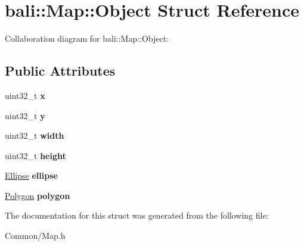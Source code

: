 \hypertarget{structbali_1_1_map_1_1_object}{\section{bali\-:\-:Map\-:\-:Object Struct Reference}
\label{structbali_1_1_map_1_1_object}
}


Collaboration diagram for bali\-:\-:Map\-:\-:Object\-:
\subsection*{Public Attributes}
\begin{DoxyCompactItemize}
\item 
\hypertarget{structbali_1_1_map_1_1_object_a48a676b160cba14e41cd5d424c300ed9}{uint32\-\_\-t {\bfseries x}}\label{structbali_1_1_map_1_1_object_a48a676b160cba14e41cd5d424c300ed9}

\item 
\hypertarget{structbali_1_1_map_1_1_object_a9799e10c9ddc1993c0f468b83ffc9092}{uint32\-\_\-t {\bfseries y}}\label{structbali_1_1_map_1_1_object_a9799e10c9ddc1993c0f468b83ffc9092}

\item 
\hypertarget{structbali_1_1_map_1_1_object_a9a1d1a6454c9e4ff726bd398fb3a0799}{uint32\-\_\-t {\bfseries width}}\label{structbali_1_1_map_1_1_object_a9a1d1a6454c9e4ff726bd398fb3a0799}

\item 
\hypertarget{structbali_1_1_map_1_1_object_a082189ce38ec29714a0b2bb5f135d6af}{uint32\-\_\-t {\bfseries height}}\label{structbali_1_1_map_1_1_object_a082189ce38ec29714a0b2bb5f135d6af}

\item 
\hypertarget{structbali_1_1_map_1_1_object_a517b2ac63039a2f255997d10d40907d4}{\hyperlink{structbali_1_1_map_1_1_ellipse}{Ellipse} {\bfseries ellipse}}\label{structbali_1_1_map_1_1_object_a517b2ac63039a2f255997d10d40907d4}

\item 
\hypertarget{structbali_1_1_map_1_1_object_af18f407bd4f478ed4b04b0770f9fcf7d}{\hyperlink{structbali_1_1_map_1_1_polygon}{Polygon} {\bfseries polygon}}\label{structbali_1_1_map_1_1_object_af18f407bd4f478ed4b04b0770f9fcf7d}

\end{DoxyCompactItemize}


The documentation for this struct was generated from the following file\-:\begin{DoxyCompactItemize}
\item 
Common/Map.\-h\end{DoxyCompactItemize}
